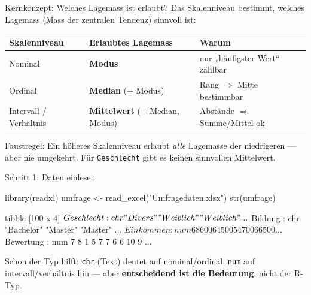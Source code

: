 \documentclass[aspectratio=169,11pt]{beamer}
\begin{document}
\begin{frame}{Kernkonzept: Welches Lagemass ist erlaubt?}
Das Skalenniveau bestimmt, welches \alert{Lagemass} (Mass der zentralen
Tendenz) sinnvoll ist:

\vspace{0.3cm}
\centering
{\small
\renewcommand{\arraystretch}{1.3}
\begin{tabular}{lll}
\toprule
Skalenniveau & Erlaubtes Lagemass & Warum \\
\midrule
Nominal     & \textbf{Modus} & nur „häufigster Wert`` zählbar \\
Ordinal     & \textbf{Median} (+ Modus) & Rang $\Rightarrow$ Mitte bestimmbar \\
Intervall / Verhältnis & \textbf{Mittelwert} (+ Median, Modus) & Abstände $\Rightarrow$ Summe/Mittel ok \\
\bottomrule
\end{tabular}
}

\vspace{0.4cm}
\begin{merke}
Faustregel: Ein höheres Skalenniveau erlaubt \emph{alle} Lagemasse der
niedrigeren --- aber nie umgekehrt. Für \texttt{Geschlecht} gibt es keinen
sinnvollen Mittelwert.
\end{merke}
\end{frame}

\begin{frame}[fragile]{Schritt 1: Daten einlesen}
\begin{rcode}
library(readxl)
umfrage <- read_excel("Umfragedaten.xlsx")
str(umfrage)
\end{rcode}
\begin{rout}
tibble [100 x 4]
 $ Geschlecht: chr  "Divers" "Weiblich" "Weiblich" ...
 $ Bildung   : chr  "Bachelor" "Master" "Master" ...
 $ Einkommen : num  68600 64500 54700 66500 ...
 $ Bewertung : num  7 8 1 5 7 7 6 6 10 9 ...
\end{rout}
\vspace{0.2cm}
\small Schon der Typ hilft: \texttt{chr} (Text) deutet auf nominal/ordinal,
\texttt{num} auf intervall/verhältnis hin --- aber \textbf{entscheidend ist
die Bedeutung}, nicht der R-Typ.
\end{frame}
\end{document}
